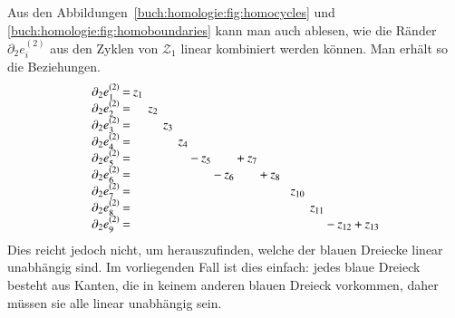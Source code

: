 Aus den Abbildungen~\ref{buch:homologie:fig:homocycles} und
\ref{buch:homologie:fig:homoboundaries} kann man auch ablesen,
wie die Ränder $\partial_2e_i^{(2)}$ aus den Zyklen von $\mathcal{Z}_1$
linear kombiniert werden können.
Man erhält so die Beziehungen.
\begin{equation}
\setcounter{MaxMatrixCols}{29}
\setlength\arraycolsep{1pt}
\begin{array}{lcrcrcrcrcrcrcrcrcrcrcrcrcr}
\partial_2e_1^{(2)} &=&z_1& &   & &   & &   & &   & &   & &   & &   & &   & &      & &      & &      & &      \\
\partial_2e_2^{(2)} &=&   & &z_2& &   & &   & &   & &   & &   & &   & &   & &      & &      & &      & &      \\
\partial_2e_3^{(2)} &=&   & &   & &z_3& &   & &   & &   & &   & &   & &   & &      & &      & &      & &      \\
\partial_2e_4^{(2)} &=&   & &   & &   & &z_4& &   & &   & &   & &   & &   & &      & &      & &      & &      \\
\partial_2e_5^{(2)} &=&   & &   & &   & &   &-&z_5& &   &+&z_7& &   & &   & &      & &      & &      & &      \\
\partial_2e_6^{(2)} &=&   & &   & &   & &   & &   &-&z_6& &   &+&z_8& &   & &      & &      & &      & &      \\
\partial_2e_7^{(2)} &=&   & &   & &   & &   & &   & &   & &   & &   & &   & &z_{10}& &      & &      & &      \\
\partial_2e_8^{(2)} &=&   & &   & &   & &   & &   & &   & &   & &   & &   & &      & &z_{11}& &      & &      \\
\partial_2e_9^{(2)} &=&   & &   & &   & &   & &   & &   & &   & &   & &   & &      & &      &-&z_{12}&+&z_{13}
\end{array}
\end{equation}
Dies reicht jedoch nicht, um herauszufinden, welche der blauen Dreiecke
linear unabhängig sind.
Im vorliegenden Fall ist dies einfach: jedes blaue Dreieck besteht aus
Kanten, die in keinem anderen blauen Dreieck vorkommen, daher müssen
sie alle linear unabhängig sein.

